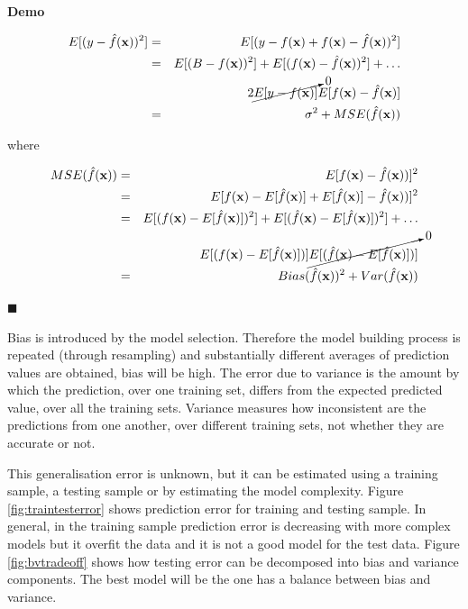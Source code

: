 \textbf{Demo}\quad

\begin{eqnarray*}
E[(y-\hat{f}(\mathbf{x}))^2] & =&
E[(y-f(\mathbf{x})+f(\mathbf{x})-\hat{f}(\mathbf{x}))^2] \\
&=& E[(B-f(\mathbf{x}))^2] +
E[(f(\mathbf{x})-\hat{f}(\mathbf{x}))^2] + \dots \\
& &
2\cancelto{0}{E[y-f(\mathbf{x})]}E[f(\mathbf{x})-\hat{f}(\mathbf{x})] \\
&=& \sigma^2 + MSE(\hat{f}(\mathbf{x}))
\end{eqnarray*}

\noindent where 

\begin{eqnarray*}
    MSE(\hat{f}(\mathbf{x})) &=&
    E[f(\mathbf{x})-\hat{f}(\mathbf{x}))]^2 \\
    &=& E[f(\mathbf{x})-E[\hat{f}(\mathbf{x})] +
    E[\hat{f}(\mathbf{x})]-\hat{f}(\mathbf{x}))]^2 \\
    &=&  E[(f(\mathbf{x})-E[\hat{f}(\mathbf{x})])^2] +
      E[(\hat{f}(\mathbf{x})-E[\hat{f}(\mathbf{x})])^2] + \dots\\
    & & E[(f(\mathbf{x})-E[\hat{f}(\mathbf{x})])] 
    \cancelto{0}{E[(\hat{f}(\mathbf{x})-E[\hat{f}(\mathbf{x})])]} \\
    &=& Bias(\hat{f}(\mathbf{x}))^2 + Var(\hat{f}(\mathbf{x}))
\end{eqnarray*}

$\blacksquare$

Bias is introduced by the model selection. Therefore the model building process is repeated (through resampling) and substantially different averages of prediction values are obtained, bias will be high. The error due to variance is the amount by which the prediction, over one training set, differs from the expected predicted value, over all the training sets. Variance measures how inconsistent are the predictions from one another, over different training sets, not whether they are accurate or not.

This generalisation error is unknown, but it can be estimated using a training sample, a testing sample or by estimating the model complexity. Figure \ref{fig:traintesterror} shows prediction error for training and testing sample.  In general, in the training sample prediction error is decreasing with more complex models but it overfit the data and it is not a good model for the test data. Figure \ref{fig:bvtradeoff} shows how testing error can be decomposed into bias and variance components. The best model will be the one has a balance between bias and variance.

